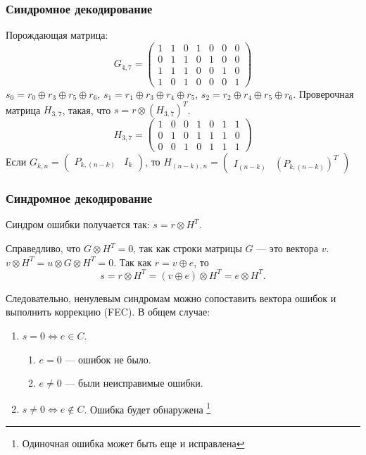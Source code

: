\begin{frame}
    \frametitle{Синдромное декодирование}
    
    Порождающая матрица:
    \[
        G_{4,7} = 
            \begin{pmatrix}
                1&1&0&1&0&0&0\\
                0&1&1&0&1&0&0\\
                1&1&1&0&0&1&0\\
                1&0&1&0&0&0&1
            \end{pmatrix}
    \]
    $s_0=r_0\oplus r_3\oplus r_5\oplus r_6$, $s_1=r_1\oplus r_3\oplus r_4\oplus r_5$, $s_2=r_2\oplus r_4\oplus r_5\oplus r_6$. Проверочная матрица $H_{3,7}$, такая, что $s=r\otimes (H_{3,7})^T$.
    \[
        H_{3,7} = 
            \begin{pmatrix}
                1&0&0&1&0&1&1\\
                0&1&0&1&1&1&0\\
                0&0&1&0&1&1&1
            \end{pmatrix}
    \]
    Если $G_{k,n}=\begin{pmatrix}P_{k,(n-k)}&I_k\end{pmatrix}$, то $H_{(n-k),n}=\begin{pmatrix}I_{(n-k)}&(P_{k,(n-k)})^T\end{pmatrix}$
\end{frame}


\begin{frame}
    \frametitle{Синдромное декодирование}
    
    \alert{Синдром} ошибки получается так: $s=r\otimes H^T$. 

    Справедливо, что $G\otimes H^T=0$, так как строки матрицы $G$ --- это вектора $v$. $v\otimes H^T=u\otimes G\otimes H^T=0$. Так как $r=v\oplus e$, то \[s=r\otimes H^T=(v\oplus e)\otimes H^T=e\otimes H^T.\]

    Следовательно, ненулевым синдромам можно сопоставить вектора ошибок и выполнить коррекцию (FEC). В общем случае:
    \begin{enumerate}
        \item $s=0\Leftrightarrow e\in C$.
        \begin{enumerate}
            \item $e=0$ --- ошибок не было.
            \item $e\neq 0$ --- были неисправимые ошибки.
        \end{enumerate}
        \item $s\neq 0\Leftrightarrow e\not\in C$. Ошибка будет обнаружена
            \footnote{Одиночная ошибка может быть еще и исправлена}
    \end{enumerate}
\end{frame}


